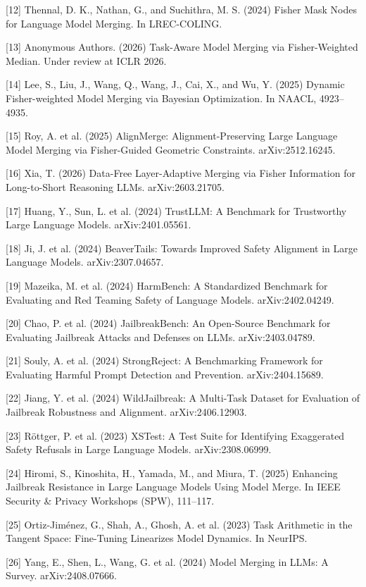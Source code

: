 \documentclass{article}
\begin{document}
{[12] Thennal, D. K., Nathan, G., and Suchithra, M. S. (2024) Fisher Mask Nodes for Language Model Merging. In LREC-COLING.

[13] Anonymous Authors. (2026) Task-Aware Model Merging via Fisher-Weighted Median. Under review at ICLR 2026.

[14] Lee, S., Liu, J., Wang, Q., Wang, J., Cai, X., and Wu, Y. (2025) Dynamic Fisher-weighted Model Merging via Bayesian Optimization. In NAACL, 4923–4935.

[15] Roy, A. et al. (2025) AlignMerge: Alignment-Preserving Large Language Model Merging via Fisher-Guided Geometric Constraints. arXiv:2512.16245.

[16] Xia, T. (2026) Data-Free Layer-Adaptive Merging via Fisher Information for Long-to-Short Reasoning LLMs. arXiv:2603.21705.

[17] Huang, Y., Sun, L. et al. (2024) TrustLLM: A Benchmark for Trustworthy Large Language Models. arXiv:2401.05561.

[18] Ji, J. et al. (2024) BeaverTails: Towards Improved Safety Alignment in Large Language Models. arXiv:2307.04657.

[19] Mazeika, M. et al. (2024) HarmBench: A Standardized Benchmark for Evaluating and Red Teaming Safety of Language Models. arXiv:2402.04249.

[20] Chao, P. et al. (2024) JailbreakBench: An Open-Source Benchmark for Evaluating Jailbreak Attacks and Defenses on LLMs. arXiv:2403.04789.

[21] Souly, A. et al. (2024) StrongReject: A Benchmarking Framework for Evaluating Harmful Prompt Detection and Prevention. arXiv:2404.15689.

[22] Jiang, Y. et al. (2024) WildJailbreak: A Multi-Task Dataset for Evaluation of Jailbreak Robustness and Alignment. arXiv:2406.12903.

[23] Röttger, P. et al. (2023) XSTest: A Test Suite for Identifying Exaggerated Safety Refusals in Large Language Models. arXiv:2308.06999.

[24] Hiromi, S., Kinoshita, H., Yamada, M., and Miura, T. (2025) Enhancing Jailbreak Resistance in Large Language Models Using Model Merge. In IEEE Security \& Privacy Workshops (SPW), 111–117.

[25] Ortiz-Jiménez, G., Shah, A., Ghosh, A. et al. (2023) Task Arithmetic in the Tangent Space: Fine-Tuning Linearizes Model Dynamics. In NeurIPS.

[26] Yang, E., Shen, L., Wang, G. et al. (2024) Model Merging in LLMs: A Survey. arXiv:2408.07666.

}
\end{document}
